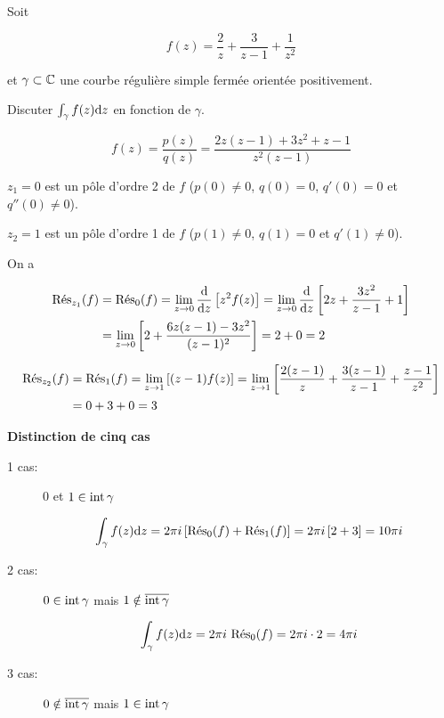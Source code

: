 \begin{example}[1]
    Soit
    
    \[ f(z) = \frac{2}{z} + \frac{3}{z - 1} + \frac{1}{z^2} \]
    
    et $\gamma \subset \Cx$ une courbe régulière simple fermée orientée positivement.
    
    Discuter $\int_\gamma f(z) \dz$ en fonction de $\gamma$.
    
    \[ f(z) = \frac{p(z)}{q(z)} = \frac{2z(z-1) + 3z^2 + z -1 }{z^2 (z - 1)} \]
    
    $z_1 = 0$ est un pôle d'ordre 2 de $f$ ($p(0) \neq 0$, $q(0) = 0$, $q'(0) = 0$ et $q''(0) \neq 0$).
    
    $z_2 = 1$ est un pôle d'ordre 1 de $f$ ($p(1) \neq 0$, $q(1) = 0$ et $q'(1) \neq 0$).
    
    On a 
    
    \begin{align*}
    \Res_{z_1}(f) &= \Res_{0}(f) = \lim_{z \rightarrow 0} \frac{\dd}{\dz} \left[ z^2 f(z) \right] = \lim_{z \rightarrow 0} \frac{\dd}{\dz} \left[ 2z + \frac{3z^2}{z - 1} + 1 \right] \\&= \lim_{z \rightarrow 0} \left[ 2 + \frac{6z(z-1) - 3z^2}{(z - 1)^2} \right] = 2 + 0 = 2
    \end{align*}
    
    \begin{align*}
    \Res_{z_2}(f) &= \Res_{1}(f) = \lim_{z \rightarrow 1} \left[ (z - 1) f(z) \right] = \lim_{z \rightarrow 1} \left[ \frac{2(z-1)}{z} + \frac{3(z-1)}{z - 1} + \frac{z -1}{z^2} \right] \\&= 0 + 3 + 0 = 3
    \end{align*}
    
    \textbf{Distinction de cinq cas}
    
    \begin{description}
    \item[1\ier{} cas:] 0 et $1 \in \inte \gamma$
    
    \[ \int_\gamma f(z) \dz = 2\pi i \left[ \Res_{0}(f) + \Res_{1}(f) \right] = 2\pi i \left[ 2 + 3 \right] = 10 \pi i \]
    
    \item[2\ieme{} cas:] $0 \in \inte \gamma$ mais $1 \notin \adh{\gamma}$
    
    \[ \int_\gamma f(z) \dz = 2\pi i \ \Res_{0}(f) = 2\pi i \cdot 2 = 4 \pi i \]
    
    \item[3\ieme{} cas:] $0 \notin \adh{\gamma}$ mais $1 \in \inte \gamma$
    

\end{description}
\end{example}
